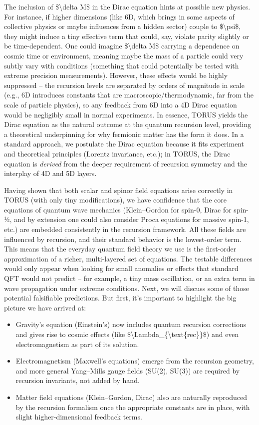 \documentclass[]{article}
\begin{document}
The inclusion of \$\textbackslash{}delta M\$ in the Dirac equation hints
at possible new physics. For instance, if higher dimensions (like 6D,
which brings in some aspects of collective physics or maybe influences
from a hidden sector) couple to \$\textbackslash{}psi\$, they might
induce a tiny effective term that could, say, violate parity slightly or
be time-dependent. One could imagine \$\textbackslash{}delta M\$
carrying a dependence on cosmic time or environment, meaning maybe the
mass of a particle could very subtly vary with conditions (something
that could potentially be tested with extreme precision measurements).
However, these effects would be highly suppressed -- the recursion
levels are separated by orders of magnitude in scale (e.g., 6D
introduces constants that are macroscopic/thermodynamic, far from the
scale of particle physics), so any feedback from 6D into a 4D Dirac
equation would be negligibly small in normal experiments. In essence,
TORUS yields the Dirac equation as the natural outcome at the quantum
recursion level, providing a theoretical underpinning for why fermionic
matter has the form it does. In a standard approach, we postulate the
Dirac equation because it fits experiment and theoretical principles
(Lorentz invariance, etc.); in TORUS, the Dirac equation is
\emph{derived} from the deeper requirement of recursion symmetry and the
interplay of 4D and 5D layers.

Having shown that both scalar and spinor field equations arise correctly
in TORUS (with only tiny modifications), we have confidence that the
core equations of quantum wave mechanics (Klein--Gordon for spin-0,
Dirac for spin-½, and by extension one could also consider Proca
equations for massive spin-1, etc.) are embedded consistently in the
recursion framework. All these fields are influenced by recursion, and
their standard behavior is the lowest-order term. This means that the
everyday quantum field theory we use is the first-order approximation of
a richer, multi-layered set of equations. The testable differences would
only appear when looking for small anomalies or effects that standard
QFT would not predict -- for example, a tiny mass oscillation, or an
extra term in wave propagation under extreme conditions. Next, we will
discuss some of those potential falsifiable predictions. But first, it's
important to highlight the big picture we have arrived at:

\begin{itemize}
\item
  Gravity's equation (Einstein's) now includes quantum recursion
  corrections and gives rise to cosmic effects (like
  \$\textbackslash{}Lambda\_\{\textbackslash{}text\{rec\}\}\$) and even
  electromagnetism as part of its solution.
\item
  Electromagnetism (Maxwell's equations) emerge from the recursion
  geometry, and more general Yang--Mills gauge fields (SU(2), SU(3)) are
  required by recursion invariants, not added by hand.
\item
  Matter field equations (Klein--Gordon, Dirac) also are naturally
  reproduced by the recursion formalism once the appropriate constants
  are in place, with slight higher-dimensional feedback terms.
\end{itemize}
\end{document}
